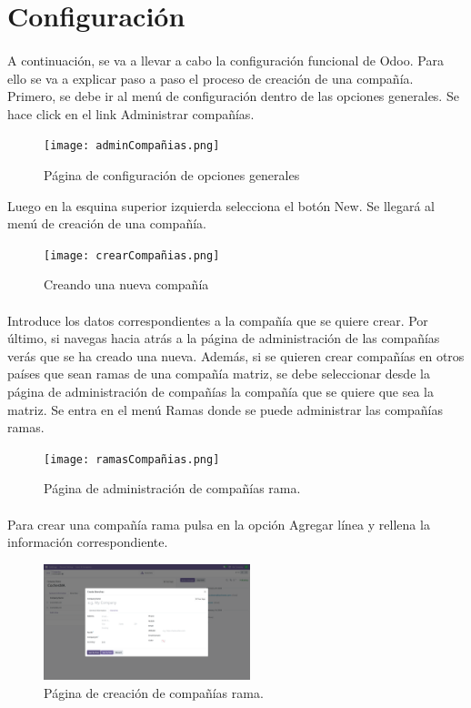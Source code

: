 \documentclass[paper=a4wide, fontsize=11pt]{report}	 %
\begin{document}
\section{Configuración}
\paragraph{}
A continuación, se va a llevar a cabo la configuración funcional de Odoo. Para ello se va a explicar paso a paso el proceso de creación de una compañía. Primero, se debe ir al menú de configuración dentro de las opciones generales. Se hace click en el link Administrar compañías.
\newpage
\begin{figure}[h]
    \centering
    \texttt{[image: adminCompañias.png]}
    \caption{Página de configuración de opciones generales}
    \label{fig:faqs}
\end{figure}
Luego en la esquina superior izquierda selecciona el botón New. Se llegará al menú de creación de una compañía.
\begin{figure}[h]
    \centering
    \texttt{[image: crearCompañias.png]}
    \caption{Creando una nueva compañía}
    \label{fig:faqs}
\end{figure}
\paragraph{}
Introduce los datos correspondientes a la compañía que se quiere crear. Por último, si navegas hacia atrás a la página de administración de las compañías verás que se ha creado una nueva. Además, si se quieren crear compañías en otros países que sean ramas de una compañía matriz, se debe seleccionar desde la página de administración de compañías la compañía que se quiere que sea la matriz. Se entra en el menú Ramas donde se puede administrar las compañías ramas. 
\begin{figure}[h]
    \centering
    \texttt{[image: ramasCompañias.png]}
    \caption{Página de administración de compañías rama.}
    \label{fig:faqs}
\end{figure}
\paragraph{}
Para crear una compañía rama pulsa en la opción Agregar línea y rellena la información correspondiente. 
\newpage
\begin{figure}[h]
    \centering
    \includegraphics[width=6cm]{crearRama.png}
    \caption{Página de creación de compañías rama.}
    \label{fig:faqs}
\end{figure}
\end{document}
